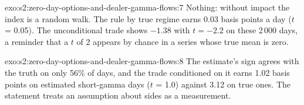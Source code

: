 \begin{solution}{exo:s2:zero-day-options-and-dealer-gamma-flows:7}
Nothing: without impact the index is a random walk. The rule by true regime earns 0.03 basis points a day ($t$ = 0.05). The unconditional trade shows
$-1.38$ with $t = -2.2$ on these 2\,000 days, a reminder that a $t$ of 2 appears by chance in a series whose true mean is zero.
\end{solution}

\begin{solution}{exo:s2:zero-day-options-and-dealer-gamma-flows:8}
The estimate's sign agrees with the truth on only 56\% of days, and the trade conditioned on it earns 1.02 basis points on estimated short-gamma days
($t$ = 1.0) against 3.12 on true ones. The statement treats an assumption about sides as a measurement.
\end{solution}

